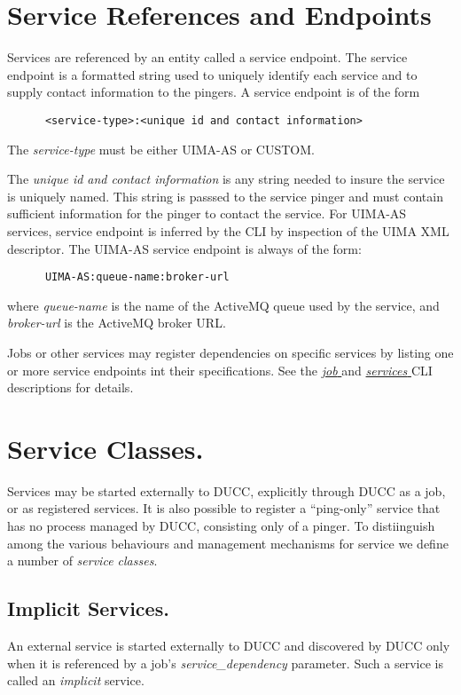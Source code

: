       \section{Service References and Endpoints} 
      \label{sec:service.endpoints}
      Services are referenced by an entity called a service
      endpoint. The service endpoint is a formatted string used to uniquely identify each
      service and to supply contact information to the pingers.  A service endpoint
      is of the form 
\begin{verbatim}
      <service-type>:<unique id and contact information>
\end{verbatim}
      
      The {\em service-type} must be either UIMA-AS or CUSTOM.
      
      The {\em unique id and contact information} is any string needed to insure the service is
      uniquely named.  This string is passsed to the service pinger and must contain sufficient
      information for the pinger to contact the service.  For UIMA-AS services, service endpoint is
      inferred by the CLI by inspection of the UIMA XML descriptor.  The UIMA-AS
      service endpoint is always of the form:
\begin{verbatim}
      UIMA-AS:queue-name:broker-url
\end{verbatim}
      where {\em queue-name} is the name of the ActiveMQ queue used by the service, and {\em broker-url}
      is the ActiveMQ broker URL.

      Jobs or other services may register dependencies on specific services by listing one or more
      service endpoints int their specifications. See the 
      \hyperref[sec:cli.ducc-submit]{\em job } and 
      \hyperref[sec:cli.ducc-services]{\em services } CLI descriptions for details.
      
      
      \section{Service Classes.} 
      \label{sec:service.classes}
      Services may be started externally to DUCC, explicitly through
      DUCC as a job, or as registered services.  It is also possible to register a ``ping-only''
      service that has no process managed by DUCC, consisting only of a pinger.  To distiinguish
      among the various behaviours and management mechanisms for service we define a number
      of {\em service classes}.

      \subsection{Implicit Services.} 
      \label{sec:services.implicit}
      An external service is started externally to DUCC and discovered by DUCC only when it is
      referenced by a job's {\em service\_dependency} parameter.  Such a service is called
      an {\em implicit} service.

